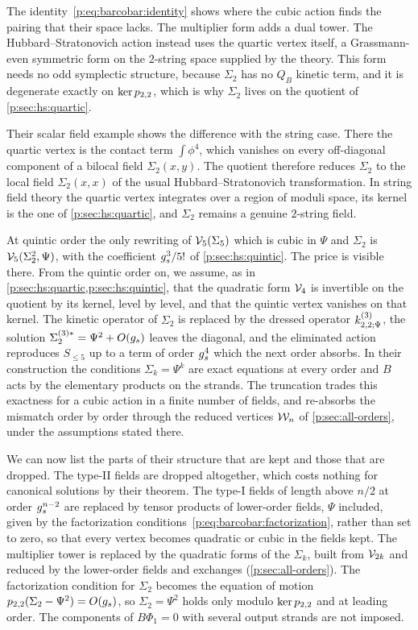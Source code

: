 The identity~\eqref{p:eq:barcobar:identity} shows where the cubic action finds the pairing that their space lacks.
The multiplier form adds a dual tower. The Hubbard--Stratonovich action instead uses the quartic vertex itself, a Grassmann-even symmetric form on the $2$-string space supplied by the theory.
This form needs no odd symplectic structure, because $\Sigma_2$ has no $Q_B$ kinetic term, and it is degenerate exactly on $\ker p_{2,2}$, which is why $\Sigma_2$ lives on the quotient of \cref{p:sec:hs:quartic}.

Their scalar field example shows the difference with the string case.
There the quartic vertex is the contact term $\int \phi^4$, which vanishes on every off-diagonal component of a bilocal field $\Sigma_2(x, y)$.
The quotient therefore reduces $\Sigma_2$ to the local field $\Sigma_2(x, x)$ of the usual Hubbard--Stratonovich transformation.
In string field theory the quartic vertex integrates over a region of moduli space, its kernel is the one of \cref{p:sec:hs:quartic}, and $\Sigma_2$ remains a genuine $2$-string field.

At quintic order the only rewriting of $\mathcal{V}_{5}(\Sigma_5)$ which is cubic in $\Psi$ and $\Sigma_2$ is $\mathcal{V}_{5}(\Sigma_2^2, \Psi)$, with the coefficient $g_s^3 / 5!$ of \cref{p:sec:hs:quintic}.
The price is visible there.
From the quintic order on, we assume, as in \cref{p:sec:hs:quartic,p:sec:hs:quintic}, that the quadratic form $\mathcal{V}_{4}$ is invertible on the quotient by its kernel, level by level, and that the quintic vertex vanishes on that kernel.
The kinetic operator of $\Sigma_2$ is replaced by the dressed operator $\kin{2}{\Psi}{3}$, the solution $\Sigma_2^{(3)*} = \Psi^2 + O(g_s)$ leaves the diagonal, and the eliminated action reproduces $S_{\le 5}$ up to a term of order $g_s^4$ which the next order absorbs.
In their construction the conditions $\Sigma_k = \Psi^k$ are exact equations at every order and $B$ acts by the elementary products on the strands.
The truncation trades this exactness for a cubic action in a finite number of fields, and re-absorbs the mismatch order by order through the reduced vertices $\mathcal{W}_{n}$ of \cref{p:sec:all-orders}, under the assumptions stated there.

We can now list the parts of their structure that are kept and those that are dropped.
The type-II fields are dropped altogether, which costs nothing for canonical solutions by their theorem.
The type-I fields of length above $n / 2$ at order $g_s^{n-2}$ are replaced by tensor products of lower-order fields, $\Psi$ included, given by the factorization conditions~\eqref{p:eq:barcobar:factorization}, rather than set to zero, so that every vertex becomes quadratic or cubic in the fields kept.
The multiplier tower is replaced by the quadratic forms of the $\Sigma_k$, built from $\mathcal{V}_{2k}$ and reduced by the lower-order fields and exchanges (\cref{p:sec:all-orders}).
The factorization condition for $\Sigma_2$ becomes the equation of motion $p_{2,2}(\Sigma_2 - \Psi^2) = O(g_s)$, so $\Sigma_2 = \Psi^2$ holds only modulo $\ker p_{2,2}$ and at leading order.
The components of $B \Phi_1 = 0$ with several output strands are not imposed.

